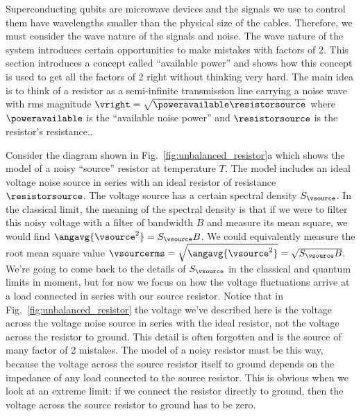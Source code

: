  \label{available_power}

Superconducting qubits are microwave devices and the signals we use to control them have wavelengths smaller than the physical size of the cables.
Therefore, we must consider the wave nature of the signals and noise.
The wave nature of the system introduces certain opportunities to make mistakes with factors of 2.
This section introduces a concept called ``available power'' and shows how this concept is used to get all the factors of 2 right without thinking very hard.
The main idea is to think of a resistor as a semi-infinite transmission line carrying a noise wave with rms magnitude $\vright = \sqrt{\poweravailable \resistorsource}$ where $\poweravailable$ is the ``available noise power'' and $\resistorsource$ is the resistor's resistance..


Consider the diagram shown in Fig.~\ref{fig:unbalanced_resistor}a which shows the model of a noisy ``source'' resistor at temperature $T$.
The model includes an ideal voltage noise source in series with an ideal resistor of resistance $\resistorsource$.
The voltage source has a certain spectral density $S_{\vsource}$.
In the classical limit, the meaning of the spectral density is that if we were to filter this noisy voltage with a filter of bandwidth $B$ and measure its mean square, we would find $\angavg{\vsource^2} = S_{\vsource} B$.
We could equivalently measure the root mean square value $\vsourcerms = \sqrt{\angavg{\vsource^2}}=\sqrt{S_{\vsource} B}$.
We're going to come back to the details of $S_{\vsource}$ in the classical and quantum limits in  moment, but for now we focus on how the voltage fluctuations arrive at a load connected in series with our source resistor.
Notice that in Fig.~\ref{fig:unbalanced_resistor} the voltage we've described here is the voltage across the voltage noise source in series with the ideal resistor, not the voltage across the resistor to ground.
This detail is often forgotten and is the source of many factor of 2 mistakes.
The model of a noisy resistor must be this way, because the voltage across the source resistor itself to ground depends on the impedance of any load connected to the source resistor.
This is obvious when we look at an extreme limit: if we connect the resistor directly to ground, then the voltage across the source resistor to ground has to be zero.

